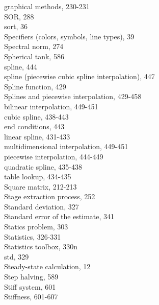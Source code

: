 \documentclass[../main.tex]{subfiles}
\begin{document}
\begin{multicols}{3}
    \hspace*{3mm}graphical methods, 230-231\\
    SOR, 288\\
    sort, 36\\
    Specifiers (colors, symbols, line types), 39\\
    Spectral norm, 274\\
    Spherical tank, 586\\
    spline, 444\\
    spline (piecewise cubic spline interpolation), 447\\
    Spline function, 429\\
    Splines and piecewise interpolation, 429-458\\
    \hspace*{3mm}bilinear interpolation, 449-451\\
    \hspace*{3mm}cubic spline, 438-443\\
    \hspace*{3mm}end conditions, 443\\
    \hspace*{3mm}linear spline, 431-433\\
    \hspace*{3mm}multidimensional interpolation, 449-451\\
    \hspace*{3mm}piecewise interpolation, 444-449\\
    \hspace*{3mm}quadratic spline, 435-438\\
    \hspace*{3mm}table lookup, 434-435\\
    Square matrix, 212-213\\
    Stage extraction process, 252\\
    Standard deviation, 327\\
    Standard error of the estimate, 341\\
    Statics problem, 303\\
    Statistics, 326-331\\
    Statistics toolbox, 330n\\
    std, 329\\
    Steady-state calculation, 12\\
    Step halving, 589\\
    Stiff system, 601\\
    Stiffness, 601-607\\

\end{multicols}
\end{document}
